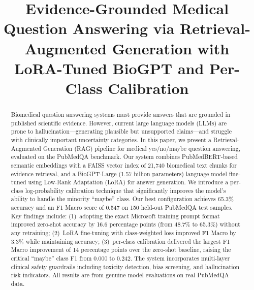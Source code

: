 \documentclass[conference]{IEEEtran}
\begin{document}
\title{Evidence-Grounded Medical Question Answering via Retrieval-Augmented Generation with LoRA-Tuned BioGPT and Per-Class Calibration}

\author{
}

\maketitle

\begin{abstract}
Biomedical question answering systems must provide answers that are grounded in published scientific evidence. However, current large language models (LLMs) are prone to hallucination---generating plausible but unsupported claims---and struggle with clinically important uncertainty categories. In this paper, we present a Retrieval-Augmented Generation (RAG) pipeline for medical yes/no/maybe question answering, evaluated on the PubMedQA benchmark. Our system combines PubMedBERT-based semantic embeddings with a FAISS vector index of 21,740 biomedical text chunks for evidence retrieval, and a BioGPT-Large (1.57 billion parameters) language model fine-tuned using Low-Rank Adaptation (LoRA) for answer generation. We introduce a per-class log-probability calibration technique that significantly improves the model's ability to handle the minority ``maybe'' class. Our best configuration achieves 65.3\% accuracy and an F1 Macro score of 0.547 on 150 held-out PubMedQA test samples. Key findings include: (1)~adopting the exact Microsoft training prompt format improved zero-shot accuracy by 16.6 percentage points (from 48.7\% to 65.3\%) without any retraining; (2)~LoRA fine-tuning with class-weighted loss improved F1 Macro by 3.3\% while maintaining accuracy; (3)~per-class calibration delivered the largest F1 Macro improvement of 14 percentage points over the zero-shot baseline, raising the critical ``maybe'' class F1 from 0.000 to 0.242. The system incorporates multi-layer clinical safety guardrails including toxicity detection, bias screening, and hallucination risk indicators. All results are from genuine model evaluations on real PubMedQA data.
\end{abstract}
\end{document}
